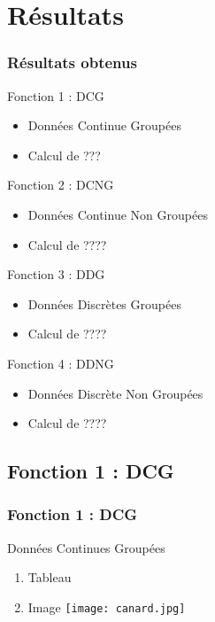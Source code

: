 \documentclass{beamer}
\begin{document}
\section{Résultats}
\begin{frame}[label=Résultats]
\frametitle{Résultats obtenus}
\begin{beamerboxesrounded}[shadow=true]{Fonction 1 : DCG}
	\begin{itemize}
			\item Données Continue Groupées
			\item Calcul de ???
	\end{itemize}
\end{beamerboxesrounded}

\begin{beamerboxesrounded}[shadow=true]{Fonction 2 : DCNG}
	\begin{itemize}
			\item Données Continue Non Groupées
			\item Calcul de ????
	\end{itemize}
\end{beamerboxesrounded}

\begin{beamerboxesrounded}[shadow=true]{Fonction 3 : DDG}
	\begin{itemize}
			\item Données Discrètes Groupées
			\item Calcul de ????
	\end{itemize}
\end{beamerboxesrounded}

\begin{beamerboxesrounded}[shadow=true]{Fonction 4 : DDNG}
	\begin{itemize}
			\item Données Discrète Non Groupées
			\item Calcul de ????
	\end{itemize}
\end{beamerboxesrounded}
\end{frame}

\subsection{Fonction 1 : DCG}
\begin{frame}[label=Fonction 1 : DCG]
\frametitle{Fonction 1 : DCG}
\begin{beamerboxesrounded}[shadow=true]{Données Continues Groupées}
		\begin{enumerate}
			\item Tableau
			\item Image
			\texttt{[image: canard.jpg]}		
		\end{enumerate}
\end{beamerboxesrounded}
\end{frame}
\end{document}
